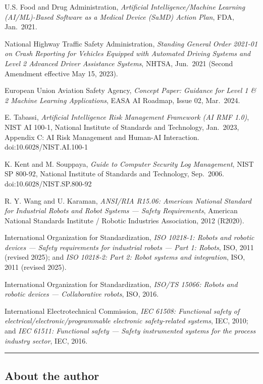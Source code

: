 \cite{ref6} U.S. Food and Drug Administration, \emph{Artificial
Intelligence/Machine Learning (AI/ML)-Based Software as a Medical Device
(SaMD) Action Plan}, FDA, Jan.~2021.

\cite{ref7} National Highway Traffic Safety Administration, \emph{Standing
General Order 2021-01 on Crash Reporting for Vehicles Equipped with
Automated Driving Systems and Level 2 Advanced Driver Assistance
Systems}, NHTSA, Jun.~2021 (Second Amendment effective May 15, 2023).

\cite{ref8} European Union Aviation Safety Agency, \emph{Concept Paper:
Guidance for Level 1 \& 2 Machine Learning Applications}, EASA AI
Roadmap, Issue 02, Mar.~2024.

\cite{ref9} E. Tabassi, \emph{Artificial Intelligence Risk Management
Framework (AI RMF 1.0)}, NIST AI 100-1, National Institute of Standards
and Technology, Jan.~2023, Appendix C: AI Risk Management and Human-AI
Interaction. doi:10.6028/NIST.AI.100-1

\cite{ref10} K. Kent and M. Souppaya, \emph{Guide to Computer Security Log
Management}, NIST SP 800-92, National Institute of Standards and
Technology, Sep.~2006. doi:10.6028/NIST.SP.800-92

\cite{ref11} R. Y. Wang and U. Karaman, \emph{ANSI/RIA R15.06: American
National Standard for Industrial Robots and Robot Systems --- Safety
Requirements}, American National Standards Institute / Robotic
Industries Association, 2012 (R2020).

\cite{ref12} International Organization for Standardization, \emph{ISO
10218-1: Robots and robotic devices --- Safety requirements for
industrial robots --- Part 1: Robots}, ISO, 2011 (revised 2025); and
\emph{ISO 10218-2: Part 2: Robot systems and integration}, ISO, 2011
(revised 2025).

\cite{ref13} International Organization for Standardization, \emph{ISO/TS
15066: Robots and robotic devices --- Collaborative robots}, ISO, 2016.

\cite{ref14} International Electrotechnical Commission, \emph{IEC 61508:
Functional safety of electrical/electronic/programmable electronic
safety-related systems}, IEC, 2010; and \emph{IEC 61511: Functional
safety --- Safety instrumented systems for the process industry sector},
IEC, 2016.

\begin{center}\rule{0.5\linewidth}{0.5pt}\end{center}

\subsection{About the author}\label{about-the-author}

